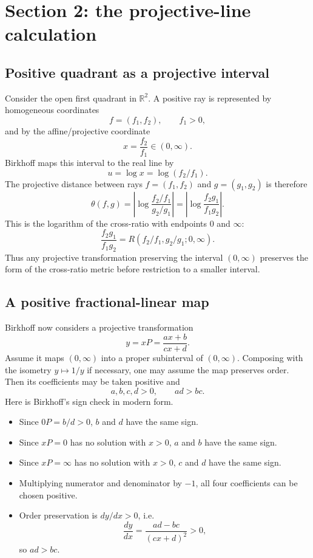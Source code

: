 \documentclass[11pt]{article}
\newcommand{\R}{\mathbb{R}}
\begin{document}
\section{Section 2: the projective-line calculation}

\subsection{Positive quadrant as a projective interval}
Consider the open first quadrant in \(\R^2\).  A positive ray is represented by homogeneous coordinates
\[
  f=(f_1,f_2),\qquad f_1>0,
\]
and by the affine/projective coordinate
\[
  x=\frac{f_2}{f_1}\in(0,\infty).
\]
Birkhoff maps this interval to the real line by
\[
  u=\log x=\log(f_2/f_1).
\]
The projective distance between rays \(f=(f_1,f_2)\) and \(g=(g_1,g_2)\) is therefore
\begin{equation}
  \theta(f,g)=\left|\log\frac{f_2/f_1}{g_2/g_1}\right|
  =\left|\log\frac{f_2g_1}{f_1g_2}\right|.
  \label{eq:birkhoff-line-metric}
\end{equation}
This is the logarithm of the cross-ratio with endpoints \(0\) and \(\infty\):
\[
  \frac{f_2g_1}{f_1g_2}=R(f_2/f_1,g_2/g_1;0,\infty).
\]
Thus any projective transformation preserving the interval \((0,\infty)\) preserves the form of the cross-ratio metric before restriction to a smaller interval.

\subsection{A positive fractional-linear map}
Birkhoff now considers a projective transformation
\begin{equation}
  y=xP=\frac{ax+b}{cx+d}.
  \label{eq:fractional-linear}
\end{equation}
Assume it maps \((0,\infty)\) into a proper subinterval of \((0,\infty)\).  Composing with the isometry \(y\mapsto 1/y\) if necessary, one may assume the map preserves order.  Then its coefficients may be taken positive and
\[
  a,b,c,d>0,\qquad ad>bc.
\]
Here is Birkhoff's sign check in modern form.
\begin{itemize}[leftmargin=2em]
\item Since \(0P=b/d>0\), \(b\) and \(d\) have the same sign.
\item Since \(xP=0\) has no solution with \(x>0\), \(a\) and \(b\) have the same sign.
\item Since \(xP=\infty\) has no solution with \(x>0\), \(c\) and \(d\) have the same sign.
\item Multiplying numerator and denominator by \(-1\), all four coefficients can be chosen positive.
\item Order preservation is \(dy/dx>0\), i.e.
\[
  \frac{dy}{dx}=\frac{ad-bc}{(cx+d)^2}>0,
\]
so \(ad>bc\).
\end{itemize}
\end{document}
